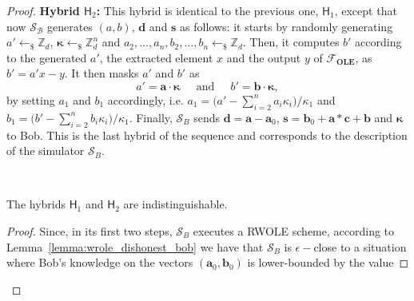 \begin{proof}
\textbf{Hybrid $\mathsf{H}_2$:} This hybrid is identical to the previous one, $\mathsf{H}_1$,  except that now $\mathcal{S_B}$ generates $(a, b)$, $\bm{d}$ and $\bm{s}$ as follows: it starts by randomly generating $a'\leftarrow_{\$} \mathbb{Z}_d$, $\bm{\kappa}\leftarrow_{\$} \mathbb{Z}^n_d$ and $a_2, \ldots, a_n, b_2, \ldots, b_n\leftarrow_{\$}\mathbb{Z}_d$. Then, it computes  $b'$  according to the generated $a'$, the extracted element $x$ and the output $y$ of $\mathcal{F}_{\textbf{OLE}}$, as $b' = a'x - y$. It then masks $a'$ and $b'$ as         \begin{equation*}
        a' = \bm{a} \cdot \bm{\kappa} \ \ \ \ \ \text{ and }\ \ \ \ \ 
        b' = \bm{b} \cdot \bm{\kappa}, 
        \end{equation*}
by setting $a_1$ and $b_1$ accordingly, i.e. $a_1 = \big(a' - \sum_{i=2}^{n} a_i \kappa_i\big)/\kappa_1$ and $b_1 = \big(b' - \sum_{i=2}^{n} b_i \kappa_i\big)/\kappa_1$. Finally, $\mathcal{S}_B$ sends $\bm{d} = \bm{a} - \bm{a}_0$, $\bm{s} = \bm{b}_0 + \bm{a}  * \bm{c} + \bm{b}$ and $\bm{\kappa}$ to Bob. This is the last hybrid of the sequence and corresponds to the description of the simulator $\mathcal{S}_B$.


\

\begin{claim}
The hybrids $\mathsf{H}_1$ and $\mathsf{H}_2$ are indistinguishable.
\label{claim:h1h2Bob}
\end{claim}

\begin{proof}

Since, in its first two steps, $\mathcal{S}_B$ executes a RWOLE scheme, according to Lemma~\ref{lemma:wrole_dishonest_bob} we have that $\mathcal{S}_B$ is $\epsilon-$close to a situation where Bob's knowledge on the vectors $(\bm{a}_0, \bm{b}_0)$ is lower-bounded by the value


\end{proof}
\end{proof}

